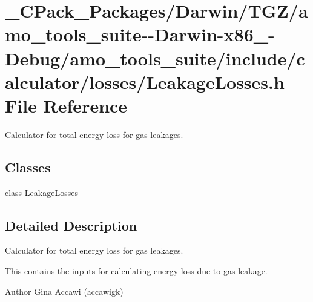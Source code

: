 \hypertarget{___c_pack___packages_2_darwin_2_t_g_z_2amo__tools__suite--_darwin-x86__64-_debug_2amo__tools__suba048982db10f544314aa4a71641743c}{}\section{\+\_\+\+C\+Pack\+\_\+\+Packages/\+Darwin/\+T\+G\+Z/amo\+\_\+tools\+\_\+suite-\/-\/\+Darwin-\/x86\+\_-\/\+Debug/amo\+\_\+tools\+\_\+suite/include/calculator/losses/\+Leakage\+Losses.h File Reference}
\label{___c_pack___packages_2_darwin_2_t_g_z_2amo__tools__suite--_darwin-x86__64-_debug_2amo__tools__suba048982db10f544314aa4a71641743c}


Calculator for total energy loss for gas leakages.  


\subsection*{Classes}
\begin{DoxyCompactItemize}
\item 
class \hyperlink{class_leakage_losses}{Leakage\+Losses}
\end{DoxyCompactItemize}


\subsection{Detailed Description}
Calculator for total energy loss for gas leakages. 

This contains the inputs for calculating energy loss due to gas leakage.

\begin{DoxyAuthor}{Author}
Gina Accawi (accawigk) 
\end{DoxyAuthor}

